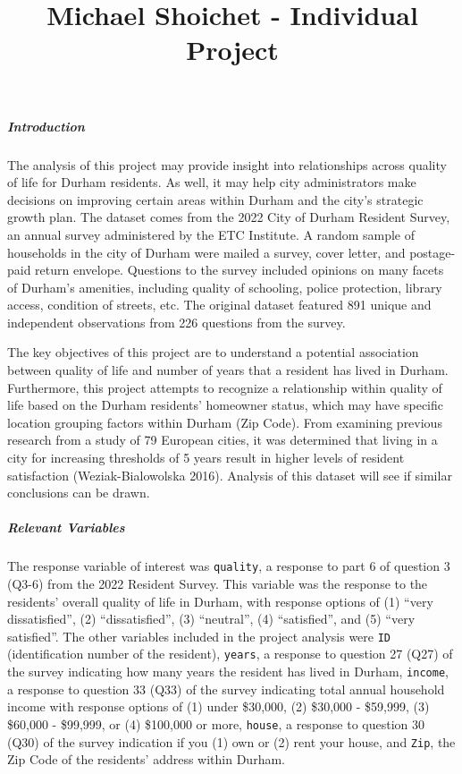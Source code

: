 \documentclass[
  4pt,
]{article}
\title{Michael Shoichet - Individual Project}
\author{}
\date{\vspace{-2.5em}}
\makeatletter
\renewcommand{\maketitle}{
  \begin{center}
    {\large \@title \par}
  \end{center}
}
\makeatother
\begin{document}
\maketitle

\subparagraph{Introduction}\label{introduction}

The analysis of this project may provide insight into relationships
across quality of life for Durham residents. As well, it may help city
administrators make decisions on improving certain areas within Durham
and the city's strategic growth plan. The dataset comes from the 2022
City of Durham Resident Survey, an annual survey administered by the ETC
Institute. A random sample of households in the city of Durham were
mailed a survey, cover letter, and postage-paid return envelope.
Questions to the survey included opinions on many facets of Durham's
amenities, including quality of schooling, police protection, library
access, condition of streets, etc. The original dataset featured 891
unique and independent observations from 226 questions from the survey.

The key objectives of this project are to understand a potential
association between quality of life and number of years that a resident
has lived in Durham. Furthermore, this project attempts to recognize a
relationship within quality of life based on the Durham residents'
homeowner status, which may have specific location grouping factors
within Durham (Zip Code). From examining previous research from a study
of 79 European cities, it was determined that living in a city for
increasing thresholds of 5 years result in higher levels of resident
satisfaction (Weziak-Bialowolska 2016). Analysis of this dataset will
see if similar conclusions can be drawn.

\subparagraph{Relevant Variables}\label{relevant-variables}

The response variable of interest was \texttt{quality}, a response to
part 6 of question 3 (Q3-6) from the 2022 Resident Survey. This variable
was the response to the residents' overall quality of life in Durham,
with response options of (1) ``very dissatisfied'', (2)
``dissatisfied'', (3) ``neutral'', (4) ``satisfied'', and (5) ``very
satisfied''. The other variables included in the project analysis were
\texttt{ID} (identification number of the resident), \texttt{years}, a
response to question 27 (Q27) of the survey indicating how many years
the resident has lived in Durham, \texttt{income}, a response to
question 33 (Q33) of the survey indicating total annual household income
with response options of (1) under \$30,000, (2) \$30,000 - \$59,999,
(3) \$60,000 - \$99,999, or (4) \$100,000 or more, \texttt{house}, a
response to question 30 (Q30) of the survey indication if you (1) own or
(2) rent your house, and \texttt{Zip}, the Zip Code of the residents'
address within Durham.
\end{document}
